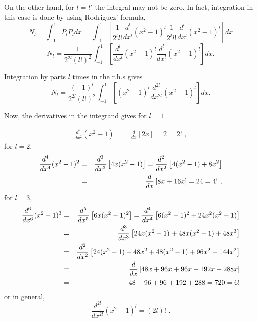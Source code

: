 On the other hand, for $l=l'$ the integral may not be zero. In fact, integration in this case is done by using Rodriguez' formula,
\begin{equation}
N_l = \int_{-1}^{1} P_{l}  P_{l}  dx = \int_{-1}^{1} \left[ \frac{1}{2^l l!} \frac{d^l}{dx^l} (x^2 - 1)^l \frac{1}{2^l l!} \frac{d^l}{dx^l} (x^2 - 1)^l \right] dx
\end{equation}
\begin{equation}
N_l  = \frac{1}{2^{2l} (l!)^2} \int_{-1}^{1} \left[ \frac{d^l}{dx^l} (x^2 - 1)^l  \frac{d^l}{dx^l} (x^2 - 1)^l \right] dx.
\end{equation}

Integration by parts $l$ times in the r.h.s gives 
\begin{equation}
N_l  = \frac{(-1)^l}{2^{2l} (l!)^2} \int_{-1}^{1} \left[(x^2 - 1)^l  \frac{d^{2l}}{dx^{2l}} (x^2 - 1)^l \right] dx.
\end{equation}

Now, the derivatives in the integrand gives for $l=1$

\begin{eqnarray}
\frac{d^2}{dx^2} (x^2 - 1) &=& \frac{d}{dx} \left[ 2 x \right] = 2 = 2! \,\, , 
\end{eqnarray}
for $l=2$,
\begin{eqnarray}
\frac{d^4}{dx^4} (x^2 - 1)^2 &=& \frac{d^3}{dx^3} \left[ 4 x(x^2-1) \right]  =  \frac{d^2}{dx^2} \left[ 4 (x^2-1)+ 8 x^2 \right] \notag \\
&=&  \frac{d}{dx} \left[ 8 x+ 16 x \right] =24 = 4! \,\, ,
\end{eqnarray}
for $l=3$,
\begin{eqnarray}
\frac{d^6}{dx^6} (x^2 - 1)^3 &=& \frac{d^5}{dx^5} \left[ 6 x(x^2-1)^2 \right]  =  \frac{d^4}{dx^4} \left[ 6 (x^2-1)^2 + 24 x^2(x^2-1) \right] \notag \\
&=&  \frac{d^3}{dx^3} \left[ 24x (x^2-1) + 48 x(x^2-1) + 48 x^3\right] \notag \\
&=&  \frac{d^2}{dx^2} \left[ 24 (x^2-1) +48x^2 + 48 (x^2-1) + 96 x^2 + 144 x^2\right]\notag \\
&=&  \frac{d}{dx} \left[ 48 x +96x + 96 x+ 192 x + 288 x\right]\notag \\
&=&  48 +96 + 96 + 192  + 288 = 720 = 6!\notag \\
\end{eqnarray}
or in general,
\begin{equation}
\frac{d^{2l}}{dx^{2l}} (x^2 -1)^l = (2l)! \,\, .
\end{equation}

